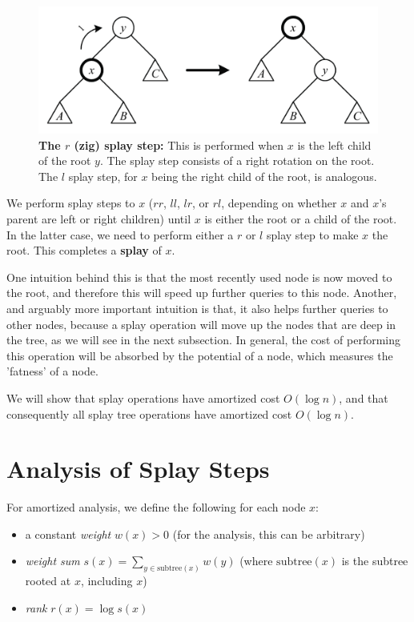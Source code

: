 \documentclass{article}
\begin{document}
\begin{figure}[ht]
\begin{center}
  \includegraphics{dzhang-splaystep-r.png}
\caption{\textbf{The $r$ (zig) splay step:} This is performed when $x$ is
the left child of the root $y$. The splay step consists of a right
rotation on the root. The $l$ splay step, for $x$ being the right
child of the root, is analogous.}
\label{fig:splaystep_r}
\end{center}
\end{figure}

We perform splay steps to $x$ ($rr$, $ll$, $lr$, or $rl$, depending on
whether $x$ and $x$'s parent are left or right children) until $x$
is either the root or a child of the root. In the latter case, we need
to perform either a $r$ or $l$ splay step to make $x$ the root.
This completes a \textbf{splay} of $x$.

One intuition behind this is that the most recently used node is now moved to the root, and therefore this will speed up further queries to this node. Another, and arguably more important intuition is that, it also helps further queries to other nodes, because a splay operation will move up the nodes that are deep in the tree, as we will see in the next subsection.
In general, the cost of performing this operation will be absorbed by the potential of a node, which measures the 'fatness' of a node.

We will show that splay operations have amortized cost $O(\log n)$,
and that consequently all splay tree operations have amortized cost
$O(\log n)$.

\section{Analysis of Splay Steps}

For amortized analysis, we define the following for each node $x$:
\begin{itemize}
\item a constant \emph{weight} $w(x) > 0$ (for the analysis, this
  can be arbitrary)
\item \emph{weight sum} $s(x) = \sum_{y \in \textrm{subtree}(x)} w(y)$
  (where $\textrm{subtree}(x)$ is the subtree rooted at $x$,
  including $x$)
\item \emph{rank} $r(x) = \log s(x)$
\end{itemize}
\end{document}
